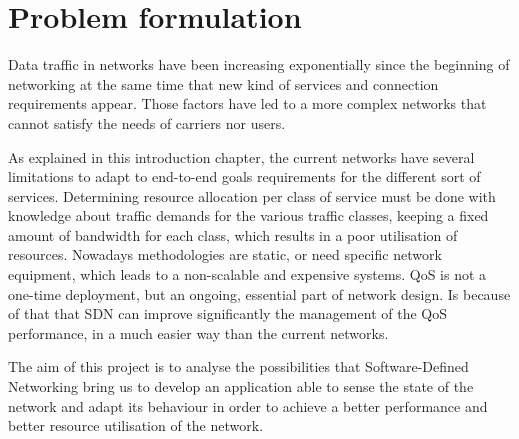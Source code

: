 \section{Problem formulation}
\label{sec:problemformulation}

Data traffic in networks have been increasing exponentially since the beginning of networking at the same time that new kind of services and connection requirements appear. Those factors have led to a more complex networks that cannot satisfy the needs of carriers nor users.

As explained in this introduction chapter, the current networks have several limitations to adapt to end-to-end goals requirements for the different sort of services. Determining resource allocation per class of service must be done with knowledge about traffic demands for the various traffic classes, keeping a fixed amount of bandwidth for each class, which results in a poor utilisation of resources. Nowadays methodologies are static, or need specific network equipment, which leads to a non-scalable and expensive systems. QoS is not a one-time deployment, but an ongoing, essential part of network design. Is because of that that SDN can improve significantly the management of the QoS performance, in a much easier way than the current networks.

The aim of this project is to analyse the possibilities that Software-Defined Networking bring us to develop an application able to sense the state of the network and adapt its behaviour in order to achieve a better performance and better resource utilisation of the network.
